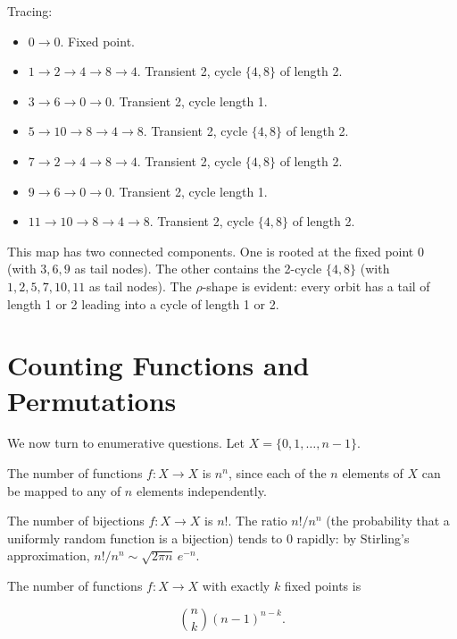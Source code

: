 Tracing:
\begin{itemize}
\item $0 \to 0$. Fixed point.
\item $1 \to 2 \to 4 \to 8 \to 4$. Transient 2, cycle $\{ 4, 8\} $ of length 2.
\item $3 \to 6 \to 0 \to 0$. Transient 2, cycle length 1.
\item $5 \to 10 \to 8 \to 4 \to 8$. Transient 2, cycle $\{ 4, 8\} $ of length 2.
\item $7 \to 2 \to 4 \to 8 \to 4$. Transient 2, cycle $\{ 4, 8\} $ of length 2.
\item $9 \to 6 \to 0 \to 0$. Transient 2, cycle length 1.
\item $11 \to 10 \to 8 \to 4 \to 8$. Transient 2, cycle $\{ 4, 8\} $ of length 2.
\end{itemize}

This map has two connected components. One is rooted at the fixed point $0$ (with $3, 6, 9$ as tail nodes). The other contains the 2-cycle $\{ 4, 8\} $ (with $1, 2, 5, 7, 10, 11$ as tail nodes). The $\rho$-shape is evident: every orbit has a tail of length 1 or 2 leading into a cycle of length 1 or 2.

\section{Counting Functions and Permutations}

We now turn to enumerative questions. Let $X = \{ 0, 1, \ldots, n-1\} $.

\begin{proposition}
The number of functions $f: X \to X$ is $n^n$, since each of the $n$ elements of $X$ can be mapped to any of $n$ elements independently.
\end{proposition}

\begin{proposition}[Permutations]
The number of bijections $f: X \to X$ is $n!$. The ratio $n!/n^n$ (the probability that a uniformly random function is a bijection) tends to 0 rapidly: by Stirling's approximation, $n!/n^n \sim \sqrt{2\pi n}\, e^{-n}$.
\end{proposition}

\begin{proposition}
The number of functions $f: X \to X$ with exactly $k$ fixed points is

\[\binom{n}{k}(n-1)^{n-k}.\]


\end{proposition}

